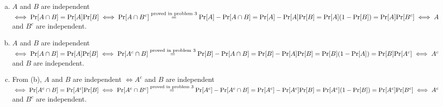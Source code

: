 \begin{pr}$ $
\begin{enumerate}[(a)]
\item $A$ and $B$ are independent $\iff\mathrm{Pr}[A\cap B]=\mathrm{Pr}[A]\mathrm{Pr}[B]\iff\mathrm{Pr}[A\cap B^c]\overset{\text{proved in problem 3}}=\mathrm{Pr}[A]-\mathrm{Pr}[A\cap B]=\mathrm{Pr}[A]-\mathrm{Pr}[A]\mathrm{Pr}[B]=\mathrm{Pr}[A](1-\mathrm{Pr}[B])=\mathrm{Pr}[A]\mathrm{Pr}[B^c]\iff A$ and $B^c$ are independent.
\item $A$ and $B$ are independent $\iff\mathrm{Pr}[A\cap B]=\mathrm{Pr}[A]\mathrm{Pr}[B]\iff\mathrm{Pr}[A^c\cap B]\overset{\text{proved in problem 3}}=\mathrm{Pr}[B]-\mathrm{Pr}[A\cap B]=\mathrm{Pr}[B]-\mathrm{Pr}[A]\mathrm{Pr}[B]=\mathrm{Pr}[B](1-\mathrm{Pr}[A])=\mathrm{Pr}[B]\mathrm{Pr}[A^c]\iff A^c$ and $B$ are independent.
\item From (b), $A$ and $B$ are independent $\iff A^c$ and $B$ are independent $\iff\mathrm{Pr}[A^c\cap B]=\mathrm{Pr}[A^c]\mathrm{Pr}[B]\iff\mathrm{Pr}[A^c\cap B^c]\overset{\text{proved in problem 3}}=\mathrm{Pr}[A^c]-\mathrm{Pr}[A^c\cap B]=\mathrm{Pr}[A^c]-\mathrm{Pr}[A^c]\mathrm{Pr}[B]=\mathrm{Pr}[A^c](1-\mathrm{Pr}[B])=\mathrm{Pr}[A^c]\mathrm{Pr}[B^c]\iff A^c$ and $B^c$ are independent.
\end{enumerate}
\end{pr}
